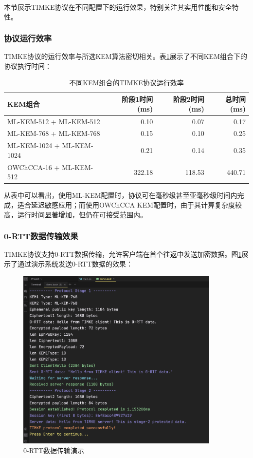 本节展示TIMKE协议在不同配置下的运行效果，特别关注其实用性能和安全特性。

\subsubsection{协议运行效率}

TIMKE协议的运行效率与所选KEM算法密切相关。表\ref{tab:runtime-performance}展示了不同KEM组合下的协议执行时间：

\begin{table}[ht]
\centering
\caption{不同KEM组合的TIMKE协议运行效率}
\label{tab:runtime-performance}
\begin{tabular}{|l|r|r|r|}
\hline
\textbf{KEM组合} & \textbf{阶段1时间(ms)} & \textbf{阶段2时间(ms)} & \textbf{总时间(ms)} \\
\hline
ML-KEM-512 + ML-KEM-512    & 0.10  & 0.07  & 0.17   \\
\hline
ML-KEM-768 + ML-KEM-768    & 0.15  & 0.10  & 0.25   \\
\hline
ML-KEM-1024 + ML-KEM-1024  & 0.21  & 0.14  & 0.35   \\
\hline
OWChCCA-16 + ML-KEM-512    & 322.18  & 118.53  & 440.71   \\
\hline
\end{tabular}
\end{table}

从表中可以看出，使用ML-KEM配置时，协议可在毫秒级甚至亚毫秒级时间内完成，适合延迟敏感应用；而使用OWChCCA KEM配置时，由于其计算复杂度较高，运行时间显著增加，但仍在可接受范围内。

\subsubsection{0-RTT数据传输效果}

TIMKE协议支持0-RTT数据传输，允许客户端在首个往返中发送加密数据。图\ref{fig:0rtt-demo}展示了通过演示系统发送0-RTT数据的效果：

\begin{figure}[ht]
\centering
\includegraphics[width=0.9\textwidth]{figures/0rtt_demo.png}
\caption{0-RTT数据传输演示}
\label{fig:0rtt-demo}
\end{figure}

